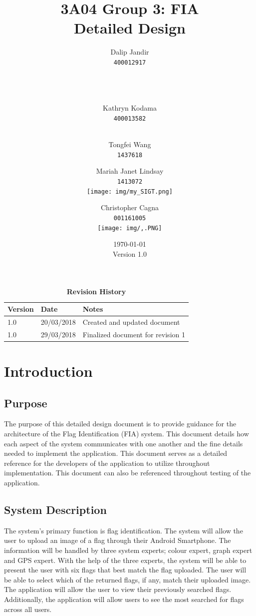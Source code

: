 \documentclass[12pt,fleqn]{article}
\title{3A04 Group 3: FIA\\ Detailed Design}
\author{
Dalip Jandir\\
	\texttt{400012917}
	\\
	\\
	\\
	\\
\and
Kathryn Kodama\\
  	\texttt{400013582}
  	\\
  	\\
\and
Tongfei Wang\\
	\texttt{1437618}
\and
Mariah Janet Lindsay\\
    \texttt{1413072}	
    \\
	    \texttt{[image: img/my\_SIGT.png]}
	\\
\and
Christopher Cagna\\
    \texttt{001161005}
    \\
    \texttt{[image: img/,.PNG]}
    \\
}
\date{\today\\ Version 1.0}
\begin{document}
\maketitle
\pagebreak
\tableofcontents

\begin{table}[ht]
\caption{\bf Revision History}
\begin{tabularx}{\textwidth}{|p{3cm}|p{2cm}|X|}
\toprule {\bf Version} & {\bf Date} & {\bf Notes}\\
\midrule
1.0 & 20/03/2018 & Created and updated document \\
1.0 & 29/03/2018 & Finalized document for revision 1 \\
\bottomrule
\end{tabularx}
\end{table}
\pagebreak

\section{Introduction}
\subsection{Purpose}
The purpose of this detailed design document is to provide guidance for the architecture of the Flag Identification (FIA) system.  This document details how each aspect of the system communicates with one another and the fine details needed to implement the application.  This document serves as a detailed reference for the developers of the application to utilize throughout implementation. This document can also be referenced throughout testing of the application.

\subsection{System Description}
The system’s primary function is flag identification.  The system will allow the user to upload an image of a flag through their Android Smartphone. The information will be handled by three system experts; colour expert, graph expert and GPS expert. With the help of the three experts, the system will be able to present the user with six flags that best match the flag uploaded. The user will be able to select which of the returned flags, if any, match their uploaded image. The application will allow the user to view their previously searched flags.  Additionally, the application will allow users to see the most searched for flags across all users.
\end{document}
